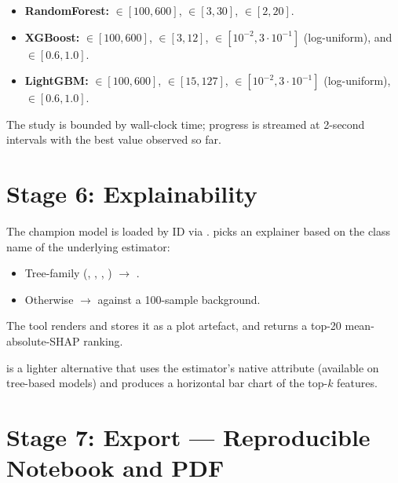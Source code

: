 \begin{itemize}[leftmargin=1.4em]
  \item \textbf{RandomForest:}  $\in [100, 600]$,
         $\in [3, 30]$, 
        $\in [2, 20]$.
  \item \textbf{XGBoost:}  $\in [100, 600]$,
         $\in [3, 12]$, 
        $\in [10^{-2}, 3\!\cdot\!10^{-1}]$ (log-uniform),
         and  $\in [0.6, 1.0]$.
  \item \textbf{LightGBM:}  $\in [100, 600]$,
         $\in [15, 127]$, 
        $\in [10^{-2}, 3\!\cdot\!10^{-1}]$ (log-uniform),
         $\in [0.6, 1.0]$.
\end{itemize}

The study is bounded by wall-clock time; progress is streamed at
2-second intervals with the best value observed so far.

\section{Stage 6: Explainability}
\label{sec:stage-explain}

The champion model is loaded by ID via
. 
picks an explainer based on the class name of the underlying
estimator:

\begin{itemize}[leftmargin=1.4em]
  \item Tree-family (, , ,
        ) $\rightarrow$ 
        \citep{lundberg2020treeshap}.
  \item Otherwise $\rightarrow$  against a
        100-sample background.
\end{itemize}

The tool renders  and stores it as a plot
artefact, and returns a top-20 mean-absolute-SHAP ranking.

 is a lighter alternative
that uses the estimator's native 
attribute (available on tree-based models) and produces a horizontal
bar chart of the top-$k$ features.

\section{Stage 7: Export --- Reproducible Notebook and PDF}
\label{sec:stage-export}

